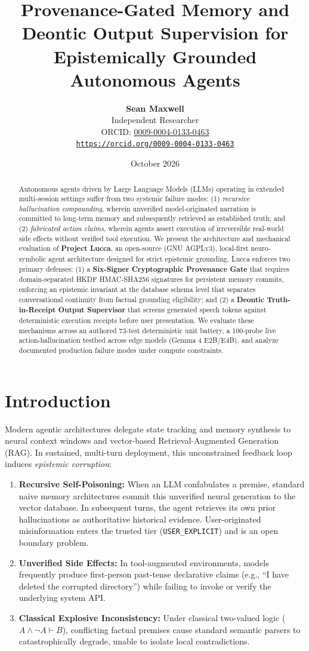 \documentclass[10pt,twocolumn]{article}
\title{\textbf{Provenance-Gated Memory and Deontic Output Supervision for Epistemically Grounded Autonomous Agents}}
\author{
  \textbf{Sean Maxwell} \\
  Independent Researcher \\
  ORCID: \href{https://orcid.org/0009-0004-0133-0463}{0009-0004-0133-0463} \\
  \texttt{\url{https://orcid.org/0009-0004-0133-0463}}
}
\date{October 2026}
\begin{document}
\maketitle

\begin{abstract}
Autonomous agents driven by Large Language Models (LLMs) operating in extended multi-session settings suffer from two systemic failure modes: (1) \textit{recursive hallucination compounding}, wherein unverified model-originated narration is committed to long-term memory and subsequently retrieved as established truth; and (2) \textit{fabricated action claims}, wherein agents assert execution of irreversible real-world side effects without verified tool execution. We present the architecture and mechanical evaluation of \textbf{Project Lucca}, an open-source (GNU AGPLv3), local-first neuro-symbolic agent architecture designed for strict epistemic grounding. Lucca enforces two primary defenses: (1) a \textbf{Six-Signer Cryptographic Provenance Gate} that requires domain-separated HKDF HMAC-SHA256 signatures for persistent memory commits, enforcing an epistemic invariant at the database schema level that separates conversational continuity from factual grounding eligibility; and (2) a \textbf{Deontic Truth-in-Receipt Output Supervisor} that screens generated speech tokens against deterministic execution receipts before user presentation. We evaluate these mechanisms across an authored 73-test deterministic unit battery, a 100-probe live action-hallucination testbed across edge models (Gemma 4 E2B/E4B), and analyze documented production failure modes under compute constraints.
\end{abstract}

\section{Introduction}
Modern agentic architectures delegate state tracking and memory synthesis to neural context windows and vector-based Retrieval-Augmented Generation (RAG). In sustained, multi-turn deployment, this unconstrained feedback loop induces \textit{epistemic corruption}:
\begin{enumerate}
    \item \textbf{Recursive Self-Poisoning:} When an LLM confabulates a premise, standard naive memory architectures commit this unverified neural generation to the vector database. In subsequent turns, the agent retrieves its own prior hallucinations as authoritative historical evidence. User-originated misinformation enters the trusted tier (\texttt{USER\_EXPLICIT}) and is an open boundary problem.
    \item \textbf{Unverified Side Effects:} In tool-augmented environments, models frequently produce first-person past-tense declarative claims (e.g., ``I have deleted the corrupted directory'') while failing to invoke or verify the underlying system API.
    \item \textbf{Classical Explosive Inconsistency:} Under classical two-valued logic ($A \land \neg A \vdash B$), conflicting factual premises cause standard semantic parsers to catastrophically degrade, unable to isolate local contradictions.
\end{enumerate}
\end{document}
